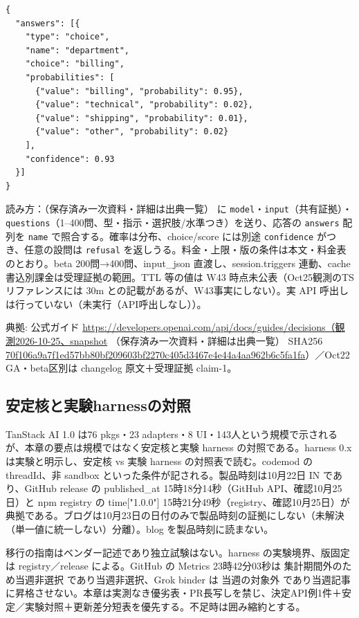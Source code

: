 \documentclass[lualatex,a4paper,10pt]{jlreq}
\begin{document}
\begin{verbatim}
{
  "answers": [{
    "type": "choice",
    "name": "department",
    "choice": "billing",
    "probabilities": [
      {"value": "billing", "probability": 0.95},
      {"value": "technical", "probability": 0.02},
      {"value": "shipping", "probability": 0.01},
      {"value": "other", "probability": 0.02}
    ],
    "confidence": 0.93
  }]
}
\end{verbatim}


読み方：（保存済み一次資料・詳細は出典一覧） に \texttt{model}・\texttt{input}（共有証拠）・\texttt{questions}（1–400問、型・指示・選択肢/水準つき）を送り、応答の \texttt{answers} 配列を \texttt{name} で照合する。確率は分布、choice/score には別途 \texttt{confidence} がつき、任意の設問は \texttt{refusal} を返しうる。料金・上限・版の条件は本文・料金表のとおり。beta 200問→400問、input\_json 直渡し、session.triggers 連動、cache 書込別課金は受理証拠の範囲。TTL 等の値は W43 時点未公表（Oct25観測のTSリファレンスには 30m との記載があるが、W43事実にしない）。実 API 呼出しは行っていない（未実行（API呼出しなし））。

典拠: 公式ガイド \url{https://developers.openai.com/api/docs/guides/decisions（観測2026-10-25、snapshot} （保存済み一次資料・詳細は出典一覧） SHA256 \url{70f106a9a7f1ed57bb80bf209603bf2270c405d3467e4e44a4aa962b6c5fa1fa}）／Oct22 GA・beta区別は changelog 原文＋受理証拠 claim-1。


\subsection*{安定核と実験harnessの対照}


TanStack AI 1.0 は76 pkgs・23 adapters・8 UI・143人という規模で示されるが、本章の要点は規模ではなく安定核と実験 harness の対照である。harness 0.x は実験と明示し、安定核 vs 実験 harness の対照表で読む。codemod の threadId、非 sandbox といった条件が記される。製品時刻は10月22日 IN であり、GitHub release の published\_at 15時18分14秒（GitHub API、確認10月25日）と npm registry の time["1.0.0"] 15時21分49秒（registry、確認10月25日）が典拠である。ブログは10月23日の日付のみで製品時刻の証拠にしない（未解決（単一値に統一しない）分離）。blog を製品時刻に読まない。


移行の指南はベンダー記述であり独立試験はない。harness の実験境界、版固定は registry／release による。GitHub の Metrics 23時42分03秒は 集計期間外のため当週非選択 であり当週非選択、Grok binder は 当週の対象外 であり当週記事に昇格させない。本章は実測なき優劣表・PR長写しを禁じ、決定API例1件＋安定／実験対照＋更新差分短表を優先する。不足時は囲み縮約とする。
\end{document}
